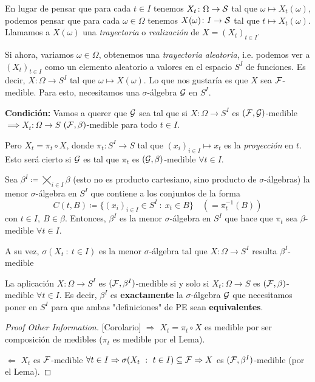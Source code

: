 En lugar de pensar que para cada $t \in I$ tenemos $X_{t} \colon \Omega \to \mathcal{S}$ tal que $\omega \mapsto X_{t}(\omega)$, podemos pensar que para cada $\omega \in \Omega$ tenemos $X(\omega) \colon I \to \mathcal{S}$ tal que $t \mapsto X_{t}(\omega)$. Llamamos a $X(\omega)$ una \textit{trayectoria} o \textit{realización} de $X = (X_{t})_{t \in I}$. \par
Si ahora, variamos $\omega \in \Omega$, obtenemos una \textit{trayectoria aleatoria}, i.e. podemos ver a $(X_{t})_{t \in I}$ como un elemento aleatorio a valores en el espacio $S^{I}$ de funciones. Es decir, $X \colon \Omega \to S^{I}$ tal que $\omega \mapsto X(\omega)$. Lo que nos gustaría es que $X$ sea $\mathcal{F}$-medible. Para esto, necesitamos una $\sigma$-álgebra $\mathcal{G}$ en $S^{I}$. \par
\textbf{Condición:} Vamos a querer que $\mathcal{G}$ sea tal que si $X \colon \Omega \to S^{I}$ es $(\mathcal{F}, \mathcal{G})$-medible $\implies X_{t} \colon \Omega \to S$ $(\mathcal{F}, \beta)$-medible para todo $t \in I$. \par
Pero $X_{t} = \pi_{t} \circ X$, donde $\pi_{t} \colon S^{I} \to S$ tal que $(x_{i})_{i \in I} \mapsto x_{t}$ es la \textit{proyección} en $t$. Esto será cierto si $\mathcal{G}$ es tal que $\pi_{t}$ es $(\mathcal{G}, \beta)$-medible $\forall t \in I$.

\begin{lemma}
	Sea $\beta^{I} \coloneq \bigtimes_{i \in I} \beta$ (esto no es producto cartesiano, sino producto de $\sigma$-álgebras) la menor $\sigma$-álgebra en $S^{I}$ que contiene a los conjuntos de la forma
	\[ C(t, B) \coloneq \{(x_{i})_{i \in I} \in S^{I} \ : \ x_{t} \in B\} \quad (= \pi_{t}^{-1}(B)) \]
	con $t \in I,\ B \in \beta$. Entonces, $\beta^{I}$ es la menor $\sigma$-álgebra en $S^{I}$ que hace que $\pi_{t}$ sea $\beta$-medible $\forall t \in I$. \par 
	A su vez, $\sigma(X_{t} \ : \ t \in I)$ es la menor $\sigma$-álgebra tal que $X \colon \Omega \to S^{I}$ resulta $\beta^{I}$-medible
\end{lemma}

\begin{corollary}
	La aplicación $X \colon \Omega \to S^{I}$ es $(\mathcal{F}, \beta^{I})$-medible si y solo si $X_{t} \colon \Omega \to S$ es $(\mathcal{F}, \beta)$-medible $\forall t \in I$. Es decir, $\beta^{I}$ es \textbf{exactamente} la $\sigma$-álgebra $\mathcal{G}$ que necesitamos poner en $S^{I}$ para que ambas "definiciones" de PE sean \textbf{equivalentes}.
\end{corollary}
\begin{proof}[Proof Other Information][Corolario]
	$\boxed{\Rightarrow}$ $X_{t} = \pi_{t} \circ X$ es medible por ser composición de medibles ($\pi_{t}$ es medible por el Lema). \par
	$\boxed{\Leftarrow}$ $X_{t}$ es $\mathcal{F}$-medible $\forall t \in I \Rightarrow \sigma(X_{t} \ : \ t \in I) \subseteq \mathcal{F} \Rightarrow X$ es $(\mathcal{F}, \beta^{I})$-medible (por el Lema).
\end{proof}


